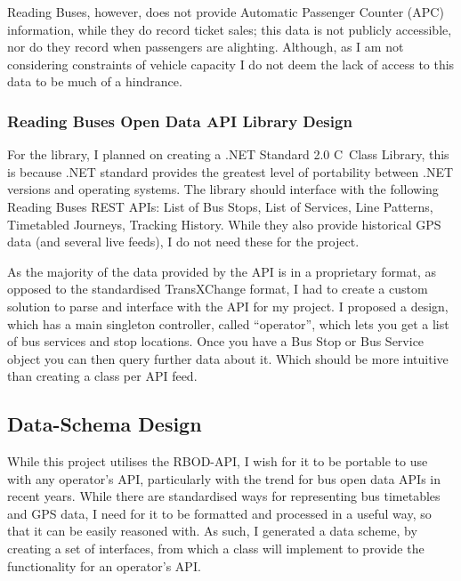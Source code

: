\documentclass{article}
\newcommand{\CS}{C\nolinebreak\hspace{-.05em}\raisebox{.6ex}{\tiny\bf \#}}
\begin{document}
\par
Reading Buses, however, does not provide Automatic Passenger Counter (APC) information, while they do record ticket sales; this data is not publicly accessible, nor do they record when passengers are alighting. Although, as I am not considering constraints of vehicle capacity I do not deem the lack of access to this data to be much of a hindrance. 


\subsubsection{Reading Buses Open Data API Library Design}
For the library, I planned on creating a .NET Standard 2.0 \CS \ Class Library, this is because .NET standard provides the greatest level of portability between .NET versions and operating systems. The library should interface with the following Reading Buses REST APIs: List of Bus Stops, List of Services, Line Patterns, Timetabled Journeys, Tracking History. While they also provide historical GPS data (and several live feeds), I do not need these for the project.


\par 
As the majority of the data provided by the API is in a proprietary format, as opposed to the standardised TransXChange format\cite{RN28}, I had to create a custom solution to parse and interface with the API for my project. I proposed a design, which has a main singleton controller, called ``operator'', which lets you get a list of bus services and stop locations. Once you have a Bus Stop or Bus Service object you can then query further data about it. Which should be more intuitive than creating a class per API feed.

\subsection{Data-Schema Design}

\par
While this project utilises the RBOD-API, I wish for it to be portable to use with any operator's API, particularly with the trend for bus open data APIs in recent years. While there are standardised ways for representing bus timetables and GPS data, I need for it to be formatted and processed in a useful way, so that it can be easily reasoned with. As such, I generated a data scheme, by creating a set of interfaces, from which a class will implement to provide the functionality for an operator's API.
\end{document}
